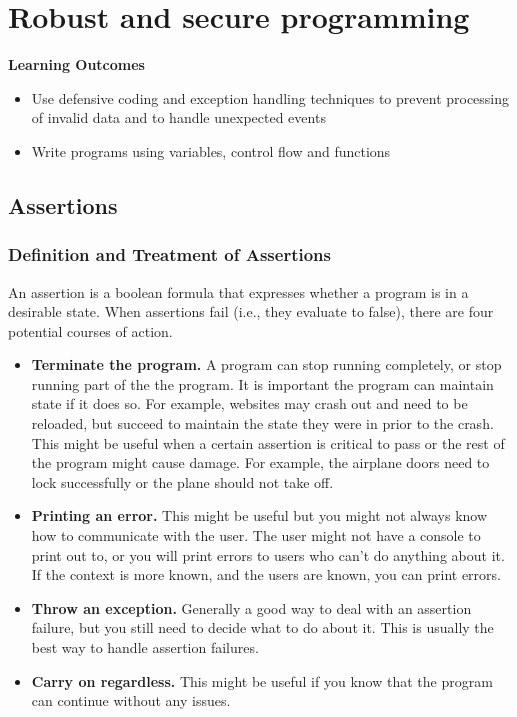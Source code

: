 \section{Robust and secure programming}
\begin{mdframed}
\textbf{Learning Outcomes}
\begin{itemize}[label={\checkmark}]
\item Use defensive coding and exception handling techniques to prevent processing of invalid data and to handle unexpected events
\item Write programs using variables, control flow and functions
\end{itemize}
\end{mdframed}

\subsection{Assertions}
\subsubsection{Definition and Treatment of Assertions} %
\label{ssub:definition_and_treatment_of_assertions}

An assertion is a boolean formula that expresses whether a program is in a desirable state. When assertions fail (i.e., they evaluate to false), there are four potential courses of action.

\begin{itemize}
	\item \textbf{Terminate the program.} A program can stop running completely, or stop running part of the the program. It is important the program can maintain state if it does so. For example, websites may crash out and need to be reloaded, but succeed to maintain the state they were in prior to the crash. This might be useful when a certain assertion is critical to pass or the rest of the program might cause damage. For example, the airplane doors need to lock successfully or the plane should not take off.
	\item \textbf{Printing an error.} This might be useful but you might not always know how to communicate with the user. The user might not have a console to print out to, or you will print errors to users who can't do anything about it. If the context is more known, and the users are known, you can print errors.
	\item \textbf{Throw an exception.} Generally a good way to deal with an assertion failure, but you still need to decide what to do about it. This is usually the best way to handle assertion failures.
	\item \textbf{Carry on regardless.} This might be useful if you know that the program can continue without any issues.
\end{itemize}

